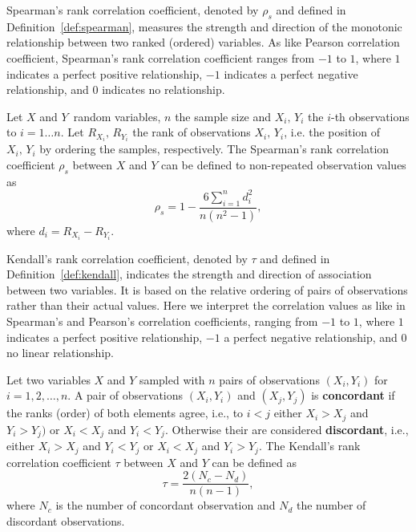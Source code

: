 Spearman's rank correlation coefficient, denoted by $\rho_s$ and defined in Definition~\ref{def:spearman}, measures the strength and direction of the monotonic relationship between two ranked (ordered) variables.  As like Pearson correlation coefficient, Spearman's rank correlation coefficient ranges from $-1$ to $1$, where $1$ indicates a perfect positive relationship, $-1$ indicates a perfect negative relationship, and $0$ indicates no relationship.
 
\begin{definition}\label{def:spearman}
Let $X$ and $Y$\ random variables, $n$ the sample size and $X_i, \, Y_i$ the $i$-th observations to $i = 1 \ldots n$. Let $R_{X_i}, \, R_{Y_i}$ the rank of observations $X_i, \, Y_i$, i.e. the position of $X_i, \, Y_i$ by ordering the samples, respectively. The Spearman's rank correlation coefficient  $\rho_s$ between $X$ and $Y$ can be defined to non-repeated observation values as 
\begin{equation}\label{eq:spearman}
\rho_s = 1 - \frac{6 \sum\limits_{i=1}^{n}d_i^2}{n(n^2 - 1)},
\end{equation}
where $d_i = R_{X_i} - R_{Y_i}$.
\end{definition}

Kendall's rank correlation coefficient, denoted by $\tau$ and defined in Definition~\ref{def:kendall},  indicates the strength and direction of association between two variables. It is based on the relative ordering of pairs of observations rather than their actual values. Here we interpret the correlation values as like in Spearman's and Pearson's correlation coefficients, ranging from $-1$ to $1$, where $1$ indicates a perfect positive relationship, $-1$ a perfect negative relationship, and $0$  no linear relationship.

\begin{definition}\label{def:kendall}
Let two variables $X$ and $Y$ sampled with $n$ pairs of observations $(X_i, Y_i)$ for $i = 1, 2, \ldots, n$. A pair of observations $(X_i, Y_i)$ and $(X_j, Y_j)$ is \textbf{concordant} if the ranks (order) of both elements agree, i.e., to $i < j$ either $X_i > X_j$ and $Y_i > Y_j)$ or $X_i < X_j$ and $Y_i < Y_j$. Otherwise their are considered \textbf{discordant}, i.e., either $X_i > X_j$ and $Y_i < Y_j$ or $X_i < X_j$ and $Y_i > Y_j$. The Kendall's rank correlation coefficient $\tau$ between $X$ and $Y$ can be defined as 
\begin{equation}\label{eq:kendall}
\tau = \frac{2(N_c - N_d)}{n(n-1)},
\end{equation}
where $N_c$ is the number of concordant observation and $N_d$ the number of discordant observations.
\end{definition}

